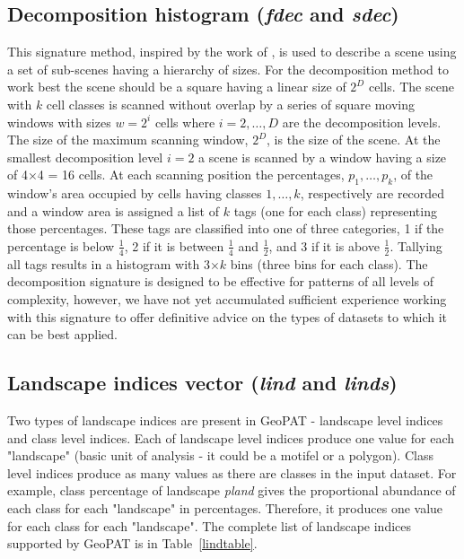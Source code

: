 \subsection{Decomposition histogram ({\it fdec} and {\it sdec})}

This signature method, inspired by the work of \cite{Remmel2006}, is used to describe a scene using a set of sub-scenes having a hierarchy of sizes. 
For the decomposition method to work best the scene should be a square having a linear size of $2^{D}$ cells.
The scene with $k$ cell classes is scanned without overlap by a series of square moving windows with sizes $w=2^{i}$ cells where $i=2, \ldots, D$ are the decomposition levels. 
The size of the maximum scanning window, $2^D$, is the size of the scene. 
At the smallest decomposition level $i=2$ a scene is scanned by a window having a size of 4$\times$4 = 16 cells. 
At each scanning position the percentages, ${p_1, \ldots, p_k}$, of the window's area occupied by cells having classes ${1, \ldots, k}$, respectively are recorded and a window area is assigned a list of $k$ tags (one for each class) representing those percentages. 
These tags are classified into one of three categories, 1 if the percentage is below $\frac{1}{4}$, 2 if it is between $\frac{1}{4}$ and $\frac{1}{2}$, and 3 if it is above $\frac{1}{2}$. 
Tallying all tags results in a histogram with 3$\times k$ bins (three bins for each class).  
The decomposition signature is designed to be effective for patterns of all levels of complexity, however, we have not yet accumulated sufficient experience working with this signature to offer definitive advice on the types of datasets to which it can be best applied. 

% 

\subsection{Landscape indices vector ({\it lind} and {\it linds})}

Two types of landscape indices are present in GeoPAT - landscape level indices and class level indices.
Each of landscape level indices produce one value for each "landscape" (basic unit of analysis - it could be a motifel or a polygon).
Class level indices produce as many values as there are classes in the input dataset.
For example, class percentage of landscape {\it pland} gives the proportional abundance of each class for each "landscape" in percentages.
Therefore, it produces one value for each class for each "landscape". 
The complete list of landscape indices supported by GeoPAT is in Table~\ref{lindtable}.

